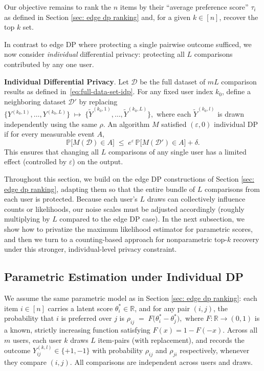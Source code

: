 \documentclass[letterpaper,12pt]{article}
\numberwithin{equation}{section}
\theoremstyle{plain}
\numberwithin{Theorem}{section}
\numberwithin{corollary}{section}
\numberwithin{proposition}{section}
\numberwithin{Lemma}{section}
{
	\theoremstyle{definition}
	\newtheorem{Definition}{Definition}
	\newtheorem{example}{Example}
	\numberwithin{example}{section}
	\newtheorem{fact}{Fact}
	\numberwithin{fact}{section}
	\newtheorem{remark}{Remark}
}
\newcommand{\1}{\mathbbm{1}}
\def\Pr{\mathbb P}
\begin{document}
Our objective remains to rank the \(n\) items by their ``average preference score'' $\tau_i$ as defined in Section \ref{sec: edge dp ranking} and, for a given \(k\in[n]\), recover the top $k$ set.

In contrast to edge DP where protecting a single pairwise outcome sufficed, we now consider \emph{individual} differential privacy: protecting all \(L\) comparisons contributed by any one user.

\medskip
\noindent
\textbf{Individual Differential Privacy}.  Let $\mathcal{D}$
be the full dataset of \(mL\) comparison results as defined in~\eqref{eq:full-data-set-idp}.  For any fixed user index \(k_0\), define a neighboring dataset \(\mathcal{D}'\) by replacing
$
\bigl\{Y^{(k_0,1)},\dots,Y^{(k_0,L)}\bigr\}
\;\longmapsto\;
\bigl\{\widetilde Y^{(k_0,1)},\dots,\widetilde Y^{(k_0,L)}\bigr\},
$
where each \(\widetilde Y^{(k_0,l)}\) is drawn independently using the same \(\rho\).  An algorithm \(M\) satisfied \((\varepsilon,0)\) individual DP if for every measurable event \(A\),
\[
\Pr\bigl[M(\mathcal{D})\in A\bigr]
\;\le\;
e^{\varepsilon}\,
\Pr\bigl[M(\mathcal{D}')\in A\bigr] + \delta.
\]
This ensures that changing all \(L\) comparisons of any single user has a limited effect (controlled by \(\varepsilon\)) on the output.

\medskip
\noindent
Throughout this section, we build on the edge DP constructions of Section \ref{sec: edge dp ranking}, adapting them so that the entire bundle of \(L\) comparisons from each user is protected.  Because each user's \(L\) draws can collectively influence counts or likelihoods, our noise scales must be adjusted accordingly (roughly multiplying by \(L\) compared to the edge DP case).  In the next subsection, we show how to privatize the maximum likelihood estimator for parametric scores, and then we turn to a counting-based approach for nonparametric top-\(k\) recovery under this stronger, individual-level privacy constraint.

\vspace{-5mm}
\subsection{Parametric Estimation under Individual DP}
\label{sec: individual parametric ranking}

We assume the same parametric model as in Section \ref{sec: edge dp ranking}: each item \(i\in[n]\) carries a latent score \(\theta^*_i\in\mathbb{R}\), and for any pair \((i,j)\), the probability that \(i\) is preferred over \(j\) is
$
\rho_{ij} \;=\; F\bigl(\theta^*_i - \theta^*_j\bigr),
$
where \(F:\mathbb{R}\to(0,1)\) is a known, strictly increasing function satisfying \(F(x)=1-F(-x)\).  Across all \(m\) users, each user \(k\) draws \(L\) item-pairs (with replacement), and records the outcome \(Y_{ij}^{(k,l)}\in\{+1,-1\}\) with probability $\rho_{ij}$ and $\rho_{ji}$ respectively, whenever they compare \((i,j)\). 
All comparisons are independent across users and draws.
\end{document}
